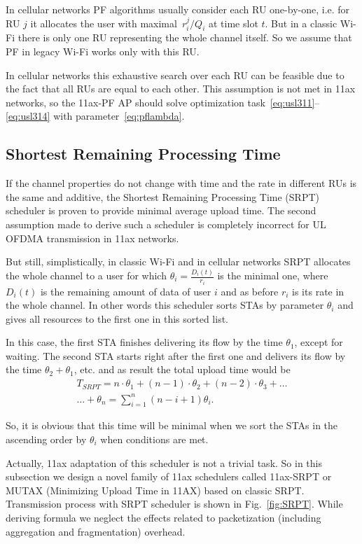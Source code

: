 In cellular networks PF algorithms usually consider each RU one-by-one, i.e. for RU $j$ it allocates the user with maximal~$r_i^j / Q_i$ at time slot $t$. But in a classic Wi-Fi there is only one RU representing the whole channel itself. So we assume that PF in legacy Wi-Fi works only with this RU.

In cellular networks this exhaustive search over each RU can be feasible due to the fact that all RUs are equal to each other. This assumption is not met in 11ax networks, so the 11ax-PF AP should solve optimization task~\eqref{eq:usl311}--\eqref{eq:usl314} with parameter~\eqref{eq:pflambda}.


\subsection{Shortest Remaining Processing Time}

If the channel properties do not change with time and the rate in different RUs is the same and additive, the Shortest Remaining Processing Time (SRPT) scheduler is proven to provide minimal average upload time. 
The second assumption made to derive such a scheduler is completely incorrect for UL OFDMA transmission in 11ax networks.

But still, simplistically, in classic Wi-Fi and in cellular networks SRPT allocates the whole channel to a user for which $\theta_i=\frac{D_i(t)}{r_i}$ is the minimal one, where $D_i(t)$ is the remaining amount of data of user $i$ and as before $r_i$ is its rate in the whole channel. 
In other words this scheduler sorts STAs by parameter $\theta_i$ and gives all resources to the first one in this sorted list. 

In this case, the first STA finishes delivering its flow by the time $\theta_1$, except for waiting.
The second STA starts right after the first one and delivers its flow by the time $\theta_2 + \theta_1$, etc. and as result the total upload time would be
\begin{multline}
\label{eq:srtfuploadtime}
T_{SRPT} = n\cdot\theta_1 + (n-1)\cdot\theta_2 + (n-2)\cdot\theta_3 + \dots \\ \dots + \theta_n = \sum_{i = 1}^n (n - i + 1) \theta_i.
\end{multline}

So, it is obvious that this time will be minimal when we sort the STAs in the ascending order by $\theta_i$ when conditions are met.

Actually, 11ax adaptation of this scheduler is not a trivial task. So in this subsection we design a novel family of 11ax schedulers called 11ax-SRPT or MUTAX (Minimizing Upload Time in 11AX) based on classic SRPT. Transmission process with SRPT scheduler is shown in Fig.~\ref{fig:SRPT}.
While deriving formula we neglect the effects related to packetization (including aggregation and fragmentation) overhead. 

